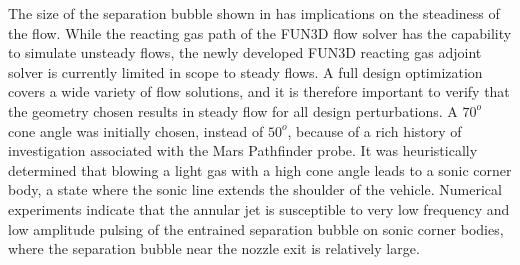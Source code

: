The size of the separation bubble shown in  has
implications on the steadiness of the flow.  While the reacting gas path of the
FUN3D flow solver has the capability to simulate unsteady flows, the newly
developed FUN3D reacting gas adjoint solver is currently limited in scope to
steady flows.  A full design optimization covers a wide variety of flow
solutions, and it is therefore important to verify that the geometry chosen
results in steady flow for all design perturbations.  A $70^o$ cone angle was
initially chosen, instead of $50^o$, because of a rich history of investigation
associated with the Mars Pathfinder probe\cite{gnoffo1996influence}.  It was
heuristically determined that blowing a light gas with a high cone angle leads
to a sonic corner body, a state where the sonic line extends the shoulder of the
vehicle.  Numerical experiments indicate that the annular jet is susceptible to
very low frequency and low amplitude pulsing of the entrained separation bubble
on sonic corner bodies, where the separation bubble near the nozzle exit is
relatively large.
